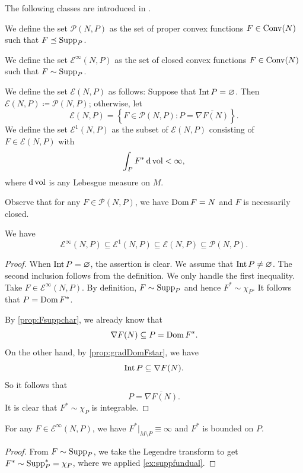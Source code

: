 The following classes are introduced in \cite{BB13}.
\begin{definition}\label{def:convexPfunctions}
    We define the set $\mathcal{P}(N,P)$ as the set of proper convex functions $F\in \mathrm{Conv}(N)$ such that $F\preceq \operatorname{Supp}_P$.

    We define the set $\mathcal{E}^{\infty}(N,P)$ as the set of closed convex functions $F\in \mathrm{Conv}(N)$ such that $F\sim \operatorname{Supp}_P$.

    We define the set $\mathcal{E}(N,P)$ as follows: Suppose that $\operatorname{Int} P=\varnothing$. Then $\mathcal{E}(N,P)\coloneqq \mathcal{P}(N,P)$; otherwise, let
    \[
    \mathcal{E}(N,P)=\left\{F\in \mathcal{P}(N,P) : P=\overline{\nabla F(N)} \right\}.
    \]
    We define the set $\mathcal{E}^1(N,P)$ as the subset of $\mathcal{E}(N,P)$ consisting of $F\in \mathcal{E}(N,P)$ with
    \[
    \int_P F^*\,\mathrm{d}\operatorname{vol}<\infty,
    \]
    where $\mathrm{d}\operatorname{vol}$ is any Lebesgue measure on $M$.
\end{definition}
Observe that for any $F\in \mathcal{P}(N,P)$, we have $\operatorname{Dom} F=N$ and $F$ is necessarily closed.

\begin{proposition}\label{prop:convex:L415}
We have
\[
\mathcal{E}^{\infty}(N,P)\subseteq \mathcal{E}^{1}(N,P)\subseteq \mathcal{E}(N,P) \subseteq \mathcal{P}(N,P).
\]
\end{proposition}
\begin{proof}
    When $\operatorname{Int} P=\varnothing$, the assertion is clear. We assume that $\operatorname{Int} P\neq \varnothing$. The second inclusion follows from the definition. We only handle the first inequality. Take $F\in \mathcal{E}^{\infty}(N,P)$. By definition, $F\sim \operatorname{Supp}_P$ and hence $F^*\sim \chi_P$. It follows that $P=\operatorname{Dom} F^*$.

    By \cref{prop:Fsuppchar}, we already know that
    \[
    \nabla F(N)\subseteq P=\operatorname{Dom} F^*.
    \]
    On the other hand, by \cref{prop:gradDomFstar}, we have
    \[
    \operatorname{Int} P\subseteq \nabla F(N).
    \]
    So it follows that
    \[
    P=\overline{\nabla F(N)}.
    \]
    It is clear that $F^*\sim \chi_P$ is integrable.
\end{proof}


\begin{proposition}\label{prop:convex:L440}
    For any $F\in \mathcal{E}^{\infty}(N,P)$, we have $F^*|_{M\setminus P}\equiv \infty$ and $F^*$ is bounded on $P$.
\end{proposition}
\begin{proof}
    From $F\sim \operatorname{Supp}_P$, we take the Legendre transform to get $F^*\sim \operatorname{Supp}_P^*=\chi_P$, where we applied \cref{ex:suppfundual}.
\end{proof}




